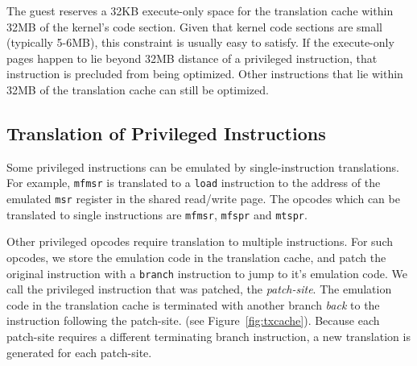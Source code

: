 \documentclass[10pt,twocolumn]{article}
\begin{document}
The guest reserves a 32KB execute-only space for the
translation cache within 32MB of the kernel's code
section. Given that kernel code sections are small (typically 5-6MB),
this constraint is usually easy to satisfy. If the execute-only
pages happen to lie beyond 32MB distance of a privileged instruction, that
instruction is precluded from being optimized. Other instructions that lie
within 32MB of the translation cache can still be optimized.

\subsection{Translation of Privileged Instructions}
Some privileged instructions can
be emulated by single-instruction translations. For example, {\tt mfmsr} is translated
to a {\tt load} instruction to the address of the emulated {\tt msr}
register in the shared read/write page. The opcodes which can be
translated to single instructions are {\tt mfmsr}, {\tt mfspr} and {\tt mtspr}.

Other privileged opcodes require translation to multiple instructions.
For such opcodes, we store the emulation code in the translation cache, and
patch the original instruction with a {\tt branch} instruction to jump to it's
emulation code. We call the privileged instruction
that was patched, the {\em patch-site}. The emulation code in the
translation cache is terminated
with another branch {\em back} to the instruction following the patch-site.
(see Figure~\ref{fig:txcache}). Because each patch-site requires a different
terminating branch instruction, a new translation is generated for
each patch-site.

\end{document}
